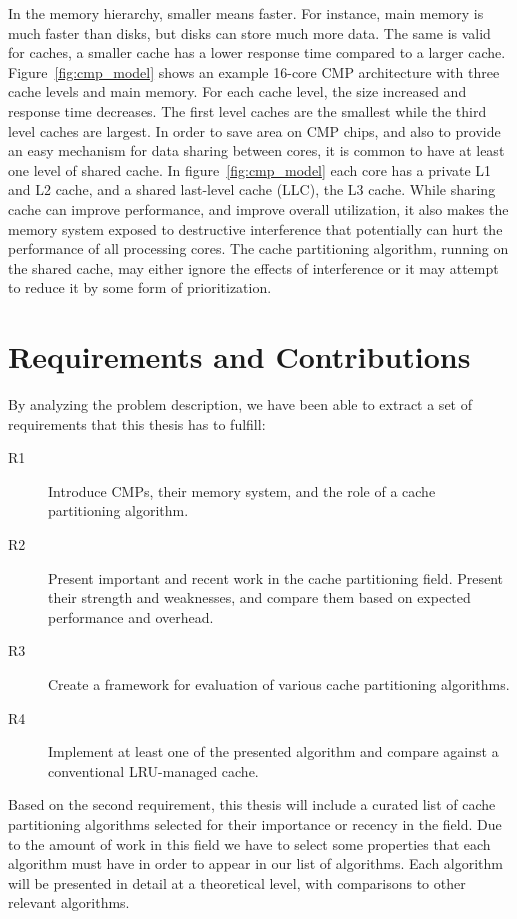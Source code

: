 In the memory hierarchy, smaller means faster. 
For instance, main memory is much faster than disks, but disks can store much more data.
The same is valid for caches, a smaller cache has a lower response time compared to a larger cache.
Figure~\ref{fig:cmp_model} shows an example 16-core CMP architecture with three cache levels and main memory.
For each cache level, the size increased and response time decreases.
The first level caches are the smallest while the third level caches are largest.
In order to save area on CMP chips, and also to provide an easy mechanism for data sharing between cores, it is common to have at least one level of shared cache.
In figure~\ref{fig:cmp_model} each core has a private L1 and L2 cache, and a shared last-level cache (LLC), the L3 cache.
While sharing cache can improve performance, and improve overall utilization, it also makes the memory system exposed to destructive interference that potentially can hurt the performance of all processing cores. 
The cache partitioning algorithm, running on the shared cache, may either ignore the effects of interference or it may attempt to reduce it by some form of prioritization.


\section{Requirements and Contributions}
By analyzing the problem description, we have been able to extract a set of requirements that this thesis has to fulfill:

\begin{description}
    \item[R1] Introduce CMPs, their memory system, and the role of a cache partitioning algorithm.
    \item[R2] Present important and recent work in the cache partitioning field. Present their strength and weaknesses, and compare them based on expected performance and overhead.
    \item[R3] Create a framework for evaluation of various cache partitioning algorithms.
    \item[R4] Implement at least one of the presented algorithm and compare against a conventional LRU-managed cache.
\end{description}

Based on the second requirement, this thesis will include a curated list of cache partitioning algorithms selected for their importance or recency in the field.
Due to the amount of work in this field we have to select some properties that each algorithm must have in order to appear in our list of algorithms.
Each algorithm will be presented in detail at a theoretical level, with comparisons to other relevant algorithms.

